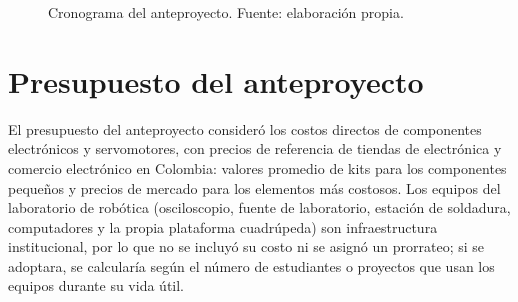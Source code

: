 \begin{figure}[H]
\centering
{}
\caption{Cronograma del anteproyecto. Fuente: elaboración propia.}
\label{fig:cronograma-anteproyecto}
\end{figure}

\section{Presupuesto del anteproyecto}

El presupuesto del anteproyecto consideró los costos directos de componentes
electrónicos y servomotores, con precios de referencia de tiendas de
electrónica y comercio electrónico en Colombia: valores promedio de kits para
los componentes pequeños y precios de mercado para los elementos más costosos.
Los equipos del laboratorio de robótica (osciloscopio, fuente de laboratorio,
estación de soldadura, computadores y la propia plataforma cuadrúpeda) son
infraestructura institucional, por lo que no se incluyó su costo ni se asignó
un prorrateo; si se adoptara, se calcularía según el número de estudiantes o
proyectos que usan los equipos durante su vida útil.

